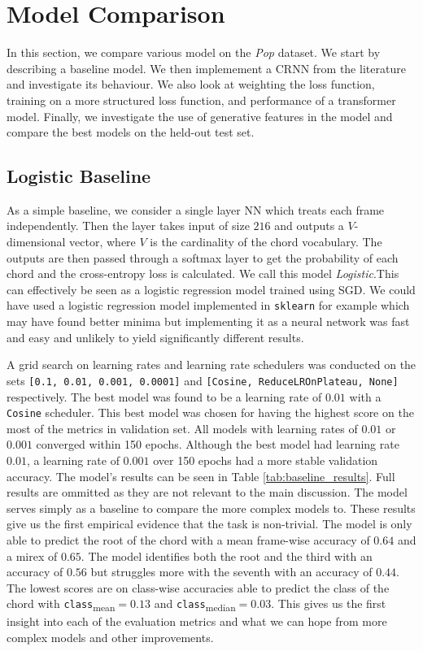 \chapter{Model Comparison}

In this section, we compare various model on the \emph{Pop} dataset. We start by describing a baseline model. We then implemement a CRNN from the literature and investigate its behaviour. We also look at weighting the loss function, training on a more structured loss function, and performance of a transformer model. Finally, we investigate the use of generative features in the model and compare the best models on the held-out test set.

\section{Logistic Baseline}

As a simple baseline, we consider a single layer NN which treats each frame independently. Then the layer takes input of size $216$ and outputs a $V$-dimensional vector, where $V$ is the cardinality of the chord vocabulary. The outputs are then passed through a softmax layer to get the probability of each chord and the cross-entropy loss is calculated. We call this model \emph{Logistic}.This can effectively be seen as a logistic regression model trained using SGD. We could have used a logistic regression model implemented in \texttt{sklearn} for example which may have found better minima but implementing it as a neural network was fast and easy and unlikely to yield significantly different results.

A grid search on learning rates and learning rate schedulers was conducted on the sets \texttt{[0.1, 0.01, 0.001, 0.0001]} and \texttt{[Cosine, ReduceLROnPlateau, None]} respectively. The best model was found to be a learning rate of $0.01$ with a \texttt{Cosine} scheduler. This best model was chosen for having the highest score on the most of the metrics in validation set. All models with learning rates of $0.01$ or $0.001$ converged within 150 epochs. Although the best model had learning rate $0.01$, a learning rate of $0.001$ over 150 epochs had a more stable validation accuracy. The model's results can be seen in Table \ref{tab:baseline_results}. Full results are ommitted as they are not relevant to the main discussion. The model serves simply as a baseline to compare the more complex models to. These results give us the first empirical evidence that the task is non-trivial. The model is only able to predict the root of the chord with a mean frame-wise accuracy of $0.64$ and a mirex of $0.65$. The model identifies both the root and the third with an accuracy of $0.56$ but struggles more with the seventh with an accuracy of $0.44$. The lowest scores are on class-wise accuracies able to predict the class of the chord with \texttt{class}\textsubscript{mean}$=0.13$ and \texttt{class}\textsubscript{median}$=0.03$. This gives us the first insight into each of the evaluation metrics and what we can hope from more complex models and other improvements.

